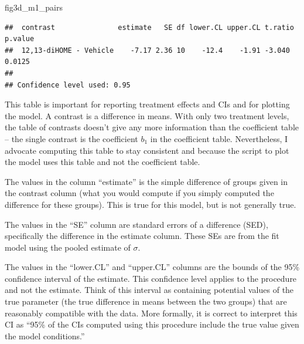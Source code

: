 \documentclass[]{book}
\newenvironment{Shaded}{\begin{snugshade}}{\end{snugshade}}
\newcommand{\NormalTok}[1]{#1}
\begin{document}
\begin{Shaded}
\begin{Highlighting}[]
\NormalTok{fig3d_m1_pairs}
\end{Highlighting}
\end{Shaded}

\begin{verbatim}
##  contrast               estimate   SE df lower.CL upper.CL t.ratio p.value
##  12,13-diHOME - Vehicle    -7.17 2.36 10    -12.4    -1.91 -3.040  0.0125 
## 
## Confidence level used: 0.95
\end{verbatim}

This table is important for reporting treatment effects and CIs and for plotting the model. A contrast is a difference in means. With only two treatment levels, the table of contrasts doesn't give any more information than the coefficient table -- the single contrast is the coefficient \(b_1\) in the coefficient table. Nevertheless, I advocate computing this table to stay consistent and because the script to plot the model uses this table and not the coefficient table.

The values in the column ``estimate'' is the simple difference of groups given in the contrast column (what you would compute if you simply computed the difference for these groups). This is true for this model, but is not generally true.

The values in the ``SE'' column are standard errors of a difference (SED), specifically the difference in the estimate column. These SEs are from the fit model using the pooled estimate of \(\sigma\).

The values in the ``lower.CL'' and ``upper.CL'' columns are the bounds of the 95\% confidence interval of the estimate. This confidence level applies to the procedure and not the estimate. Think of this interval as containing potential values of the true parameter (the true difference in means between the two groups) that are reasonably compatible with the data. More formally, it is correct to interpret this CI as ``95\% of the CIs computed using this procedure include the true value given the model conditions.''
\end{document}
